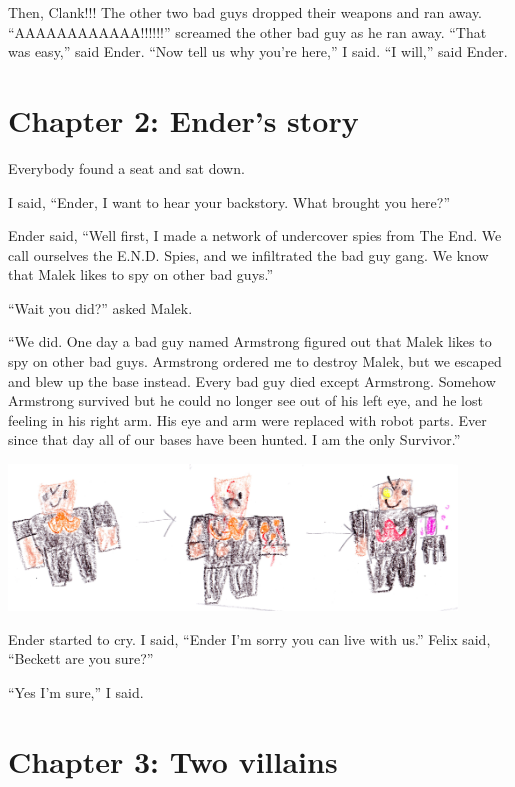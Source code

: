 \documentclass[12pt,oneside]{krantz}
\begin{document}
\clearpage

Then, Clank!!! The other two bad guys dropped their weapons and ran
away. ``AAAAAAAAAAAA!!!!!!'' screamed the other bad guy as he ran away.
``That was easy,'' said Ender. ``Now tell us why you're here,'' I said.
``I will,'' said Ender.

\hypertarget{chapter-2-enders-story}{%
\chapter*{Chapter 2: Ender's story}\label{chapter-2-enders-story}}


Everybody found a seat and sat down.

I said, ``Ender, I want to hear your backstory. What brought you here?''

Ender said, ``Well first, I made a network of undercover spies from The
End. We call ourselves the E.N.D. Spies, and we infiltrated the bad guy
gang. We know that Malek likes to spy on other bad guys.''

``Wait you did?'' asked Malek.

``We did. One day a bad guy named Armstrong figured out that Malek likes
to spy on other bad guys. Armstrong ordered me to destroy Malek, but we
escaped and blew up the base instead. Every bad guy died except
Armstrong. Somehow Armstrong survived but he could no longer see out of
his left eye, and he lost feeling in his right arm. His eye and arm were
replaced with robot parts. Ever since that day all of our bases have
been hunted. I am the only Survivor.''

\includegraphics[width=4.6875in,height=\textheight]{img/four-bad-guys/armstrong.jpg}

Ender started to cry. I said, ``Ender I'm sorry you can live with us.''
Felix said, ``Beckett are you sure?''

``Yes I'm sure,'' I said.

\hypertarget{chapter-3-two-villains}{%
\chapter*{Chapter 3: Two villains}\label{chapter-3-two-villains}}
\end{document}
